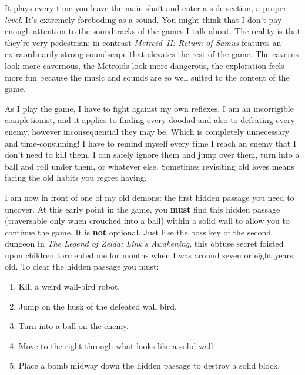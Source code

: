 \documentclass{book}
\begin{document}
It plays every time you leave the main shaft and enter a side section, a proper \emph{level}. It’s extremely foreboding as a sound. You might think that I don’t pay enough attention to the soundtracks of the games I talk about. The reality is that they’re very pedestrian; in contrast \emph{Metroid~II: Return of Samus} features an extraordinarily strong soundscape that elevates the rest of the game. The caverns look more cavernous, the Metroids look more dangerous, the exploration feels more fun because the music and sounds are so well suited to the content of the game.\par
As I play the game, I have to fight against my own reflexes. I am an incorrigible completionist, and it applies to finding every doodad and also to defeating every enemy, however inconsequential they may be. Which is completely unnecessary and time-consuming! I have to remind myself every time I reach an enemy that I don’t need to kill them. I can safely ignore them and jump over them, turn into a ball and roll under them, or whatever else. Sometimes revisiting old loves means facing the old habits you regret having.\par
I am now in front of one of my old demons: the first hidden passage you need to uncover. At this early point in the game, you \textbf{must} find this hidden passage (traversable only when crouched into a ball) within a solid wall to allow you to continue the game. It is \textbf{not} optional. Just like the boss key of the second dungeon in \emph{The Legend of Zelda: Link’s Awakening}, this obtuse secret foisted upon children tormented me for months when I was around seven or eight years old. To clear the hidden passage you must:\par
\begin{enumerate}
\item Kill a weird wall-bird robot.
\item Jump on the husk of the defeated wall bird.
\item Turn into a ball on the enemy.
\item Move to the right through what looks like a solid wall.
\item Place a bomb midway down the hidden passage to destroy a solid block.
\end{enumerate}
\FloatBarrier\vspace{\baselineskip}\centering
\begin{minipage}{0.45\linewidth}\end{minipage}\vspace{2pt}
\end{document}
